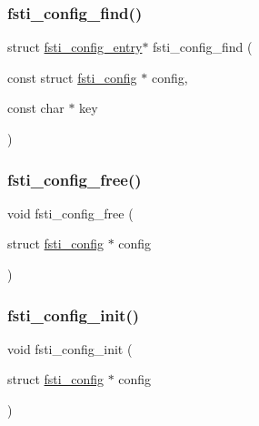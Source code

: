 \mbox{\label{fsti-config_8c_a83fb2b9e2caaf46ab1c6ff13c618718f}} 
\subsubsection{\texorpdfstring{fsti\+\_\+config\+\_\+find()}{fsti\_config\_find()}}
{\footnotesize\ttfamily struct \mbox{\hyperlink{structfsti__config__entry}{fsti\+\_\+config\+\_\+entry}}$\ast$ fsti\+\_\+config\+\_\+find (\begin{DoxyParamCaption}\item[{const struct \mbox{\hyperlink{structfsti__config}{fsti\+\_\+config}} $\ast$}]{config,  }\item[{const char $\ast$}]{key }\end{DoxyParamCaption})}

\mbox{\label{fsti-config_8c_a89af0836846de6cf965e78643823705c}} 
\subsubsection{\texorpdfstring{fsti\+\_\+config\+\_\+free()}{fsti\_config\_free()}}
{\footnotesize\ttfamily void fsti\+\_\+config\+\_\+free (\begin{DoxyParamCaption}\item[{struct \mbox{\hyperlink{structfsti__config}{fsti\+\_\+config}} $\ast$}]{config }\end{DoxyParamCaption})}

\mbox{\label{fsti-config_8c_abf23f5142b201c8f6e9db888be75f924}} 
\subsubsection{\texorpdfstring{fsti\+\_\+config\+\_\+init()}{fsti\_config\_init()}}
{\footnotesize\ttfamily void fsti\+\_\+config\+\_\+init (\begin{DoxyParamCaption}\item[{struct \mbox{\hyperlink{structfsti__config}{fsti\+\_\+config}} $\ast$}]{config }\end{DoxyParamCaption})}


